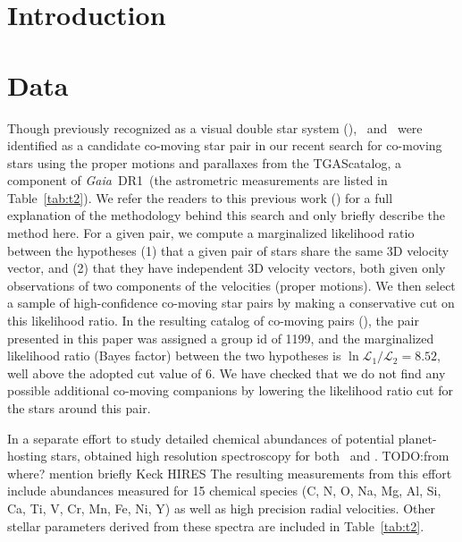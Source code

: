 \documentclass[manuscript]{aastex6}
\newcommand{\project}[1]{\textsl{#1}}
\newcommand{\acronym}[1]{{\small{#1}}}
\newcommand{\gaia}{\project{Gaia}}
\newcommand{\dr}{\acronym{DR1}}
\newcommand{\tgas}{\acronym{TGAS}}
\newcommand{\sunanalog}{\text{HD 240429}}
\newcommand{\bizarreone}{\text{HD 240430}}
\newcommand{\todo}[1]{{\color{blue}TODO:#1}}
\renewcommand\tablename{Table}
\begin{document}
\section{Introduction} %
\label{sec:introduction}


\section{Data}
\label{sec:data}

Though previously recognized as a visual double star system
(\citealt{2001AJ....122.3466M}), \sunanalog\ and \bizarreone\ were identified as a
candidate co-moving star pair in our recent search for co-moving stars using the
proper motions and parallaxes from the \tgas catalog, a component of \gaia\ \dr\
(the astrometric measurements are listed in \tablename~\ref{tab:t2}).
We refer the readers to this previous work (\citealt{2016arXiv161202440O}) for a
full explanation of the methodology behind this search and only briefly describe
the method here.
For a given pair, we compute a marginalized likelihood ratio between the
hypotheses (1) that a given pair of stars share the same 3D velocity vector, and
(2) that they have independent 3D velocity vectors, both given only observations
of two components of the velocities (proper motions).
We then select a sample of high-confidence co-moving star pairs by making a
conservative cut on this likelihood ratio.
In the resulting catalog of co-moving pairs (\citealt{2016arXiv161202440O}),
the pair presented in this paper was assigned a group id of 1199,
and the marginalized likelihood ratio (Bayes factor)
between the two hypotheses is $\ln{\mathcal{L}_1/\mathcal{L}_2} = 8.52$,
well above the adopted cut value of 6.
We have checked that we do not find any possible additional co-moving companions
by lowering the likelihood ratio cut for the stars around this pair.

In a separate effort to study detailed chemical abundances of
potential planet-hosting stars, \citet{2016ApJS..225...32B}
obtained high resolution spectroscopy for both \sunanalog\ and \bizarreone.
\todo{from where? mention briefly Keck HIRES}
The resulting measurements from this effort include abundances measured for 15
chemical species (C, N, O, Na, Mg, Al, Si, Ca, Ti, V, Cr, Mn, Fe, Ni, Y) as
well as high precision radial velocities.
Other stellar parameters derived from these spectra are included in
\tablename~\ref{tab:t2}.
\end{document}
